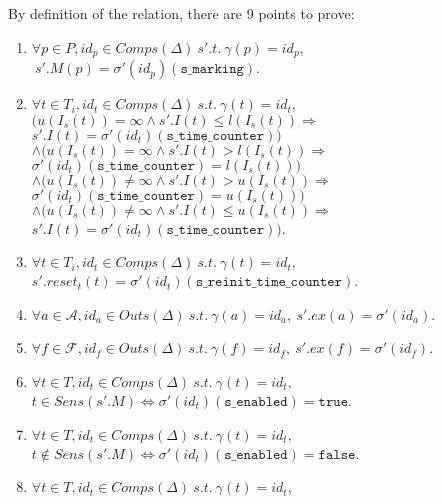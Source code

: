 \documentclass[dvipsnames,12pt]{article}
\begin{document}
\begin{niproof}
  By definition of the  relation,
  there are 9 points to prove:
  \begin{frameb}
    \begin{enumerate}
    \item
      $\forall{}p\in{}P,id_p\in{}Comps(\Delta)~s'.t.~\gamma(p)=id_p,$
      $~s'.M(p)=\sigma'(id_p)(\texttt{s\_marking})$.\label{it:marking-eq-re}
    \item
      $\forall{}t\in{}T_i,id_t\in{}Comps(\Delta)~s.t.~\gamma(t)=id_t$,\\
      $\big(u(I_s(t))=\infty\land{}s'.I(t)\le{}l(I_s(t))\Rightarrow$
      $s'.I(t)=\sigma'(id_t)(\texttt{s\_time\_counter})\big)$\\
      $\land\big(u(I_s(t))=\infty\land{}s'.I(t)>{}l(I_s(t))\Rightarrow$
      $\sigma'(id_t)(\texttt{s\_time\_counter})=l(I_s(t))\big)$\\
      $\land\big(u(I_s(t))\neq\infty\land{}s'.I(t)>{}u(I_s(t))\Rightarrow$
      $\sigma'(id_t)(\texttt{s\_time\_counter})=u(I_s(t))\big)$\\
      $\land\big(u(I_s(t))\neq\infty\land{}s'.I(t)\le{}u(I_s(t))\Rightarrow$
      $s'.I(t)=\sigma'(id_t)(\texttt{s\_time\_counter})\big)$.\label{it:time-count-eq-re}
    \item
      $\forall{}t\in{}T_i,id_t\in{}Comps(\Delta)~s.t.~\gamma(t)=id_t,$\\
      $s'.reset_t(t)=\sigma'(id_t)(\texttt{s\_reinit\_time\_counter})$.\label{it:reset-eq-re}
    \item
      $\forall{}a\in\mathcal{A},id_a\in{}Outs(\Delta)~s.t.~\gamma(a)=id_a,~s'.ex(a)=\sigma'(id_a)$.\label{it:action-eq-re}
    \item
      $\forall{}f\in\mathcal{F},id_f\in{}Outs(\Delta)~s.t.~\gamma(f)=id_f,~s'.ex(f)=\sigma'(id_f)$.\label{it:fun-eq-re}
    \item
      $\forall{}t\in{}T,id_t\in{}Comps(\Delta)~s.t.~\gamma(t)=id_t,$\\
      $t\in{}Sens(s'.M)\Leftrightarrow\sigma'(id_t)(\texttt{s\_enabled})=\mathtt{true}$.\label{it:sens-eq-re}
    \item
      $\forall{}t\in{}T,id_t\in{}Comps(\Delta)~s.t.~\gamma(t)=id_t,$\\
      $t\notin{}Sens(s'.M)\Leftrightarrow\sigma'(id_t)(\texttt{s\_enabled})=\mathtt{false}$.\label{it:not-sens-eq-re}
    \item
      $\forall{}t\in{}T,id_t\in{}Comps(\Delta)~s.t.~\gamma(t)=id_t,$\\

\end{enumerate}
\end{frameb}
\end{niproof}
\end{document}
